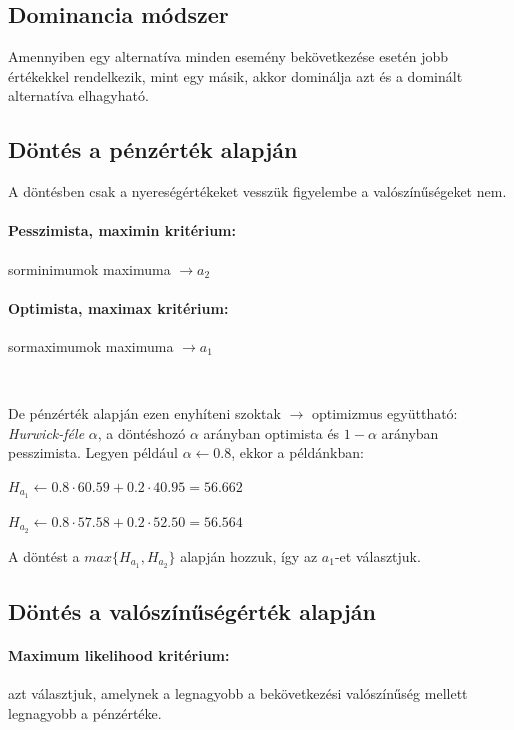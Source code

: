 \documentclass[a4paper,12pt]{article}
\begin{document}
\subsection{Dominancia módszer}
\label{susec:domi}
Amennyiben egy alternatíva minden esemény bekövetkezése esetén jobb értékekkel rendelkezik, mint egy másik, akkor dominálja azt és a dominált alternatíva elhagyható.

\subsection{Döntés a pénzérték alapján}
\label{susec:penzert}
A döntésben csak a nyereségértékeket vesszük figyelembe a valószínűségeket nem.
\paragraph{Pesszimista, maximin kritérium:}  sorminimumok maximuma $\rightarrow a_2$
\paragraph{Optimista, maximax kritérium:}  sormaximumok maximuma $\rightarrow a_1$

\

De pénzérték alapján ezen enyhíteni szoktak $\rightarrow$ optimizmus együttható: \emph{Hurwick-féle} $\alpha$, a döntéshozó $\alpha$ arányban optimista és $1-\alpha$ arányban pesszimista. Legyen például $\alpha \gets 0.8$, ekkor a példánkban: 
\begin{center}
$H_{a_1} \gets 0.8\cdot 60.59 + 0.2\cdot 40.95 = 56.662$

$H_{a_2} \gets 0.8\cdot 57.58 + 0.2\cdot 52.50 = 56.564$
\end{center}

A döntést a $max\{H_{a_1},H_{a_2}\}$ alapján hozzuk, így az $a_1$-et választjuk.

\subsection{Döntés a valószínűségérték alapján}
\label{susec:vaert}
\paragraph{Maximum likelihood kritérium: } azt választjuk, amelynek a legnagyobb a bekövetkezési valószínűség mellett legnagyobb a pénzértéke. 
\end{document}
